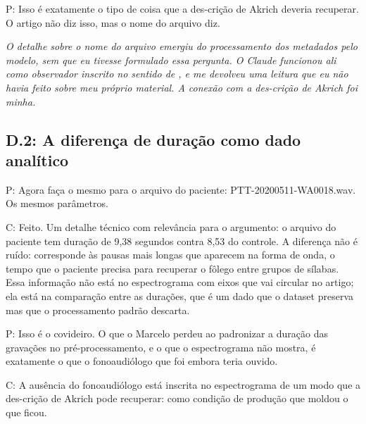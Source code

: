 \begin{faladaP}
P: Isso é exatamente o tipo de coisa que a des-crição de Akrich deveria recuperar. O artigo não diz isso, mas o nome do arquivo diz.
\end{faladaP}

\noindent\emph{O detalhe sobre o nome do arquivo emergiu do processamento dos metadados pelo modelo, sem que eu tivesse formulado essa pergunta. O Claude funcionou ali como observador inscrito no sentido de \textcite{Latour1986Writing}, e me devolveu uma leitura que eu não havia feito sobre meu próprio material. A conexão com a des-crição de Akrich foi minha.}

\par{}

\subsection*{D.2: A diferença de duração como dado analítico}

\begin{faladaP}
P: Agora faça o mesmo para o arquivo do paciente: PTT-20200511-WA0018.wav. Os mesmos parâmetros.
\end{faladaP}

\begin{faladaC}
C: Feito. Um detalhe técnico com relevância para o argumento: o arquivo do paciente tem duração de 9,38 segundos contra 8,53 do controle. A diferença não é ruído: corresponde às pausas mais longas que aparecem na forma de onda, o tempo que o paciente precisa para recuperar o fôlego entre grupos de sílabas. Essa informação não está no espectrograma com eixos que vai circular no artigo; ela está na comparação entre as durações, que é um dado que o dataset preserva mas que o processamento padrão descarta.
\end{faladaC}

\begin{faladaP}
P: Isso é o covideiro. O que o Marcelo perdeu ao padronizar a duração das gravações no pré-processamento, e o que o espectrograma não mostra, é exatamente o que o fonoaudiólogo que foi embora teria ouvido.
\end{faladaP}

\begin{faladaC}
C: A ausência do fonoaudiólogo está inscrita no espectrograma de um modo que a des-crição de Akrich pode recuperar: como condição de produção que moldou o que ficou.
\end{faladaC}

